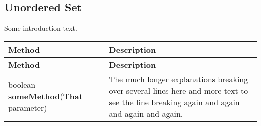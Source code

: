 \documentclass[main]{subfiles}
\begin{document}

\subsection{Unordered Set}
\renewcommand{\arraystretch}{1.5}


Some introduction text.

\scriptsize
\begin{longtable}{p{0.4\linewidth} p{0.6\linewidth}}
\hline \textbf{Method} & \textbf{Description}\\ \hline
\endfirsthead

\hline \textbf{Method} & \textbf{Description}\\ \hline\hline
\endhead
boolean \textbf{someMethod}(\textbf{That} parameter) & The much longer explanations breaking over several lines here and more text to see the line breaking again and again and again and again.\\
\end{longtable}
\todo[inline]{}
\end{document}
